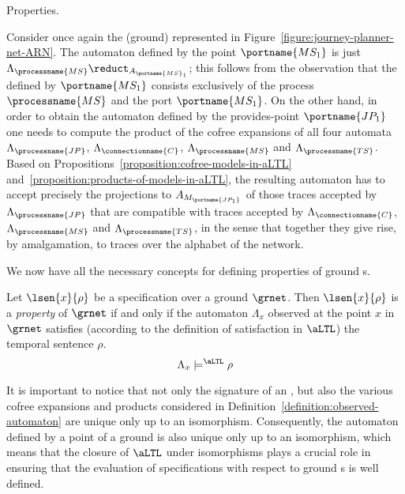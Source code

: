 \documentclass{LMCS}
\begin{document}
\begin{minisection}{Properties.}
    \begin{exa}
      Consider once again the (ground)  represented in Figure~\ref{figure:journey-planner-net-ARN}.
      The automaton defined by the point \(\portname{MS_{1}}\) is just \(\Lambda_{\processname{MS}} \reduct_{A_{\portname{MS}_{1}}}\); this follows from the observation that the  defined by \(\portname{MS_{1}}\) consists exclusively of the process \(\processname{MS}\) and the port \(\portname{MS_{1}}\).
      On the other hand, in order to obtain the automaton defined by the provides-point \(\portname{JP_{1}}\) one needs to compute the product of the cofree expansions of all four automata \(\Lambda_{\processname{JP}}\), \(\Lambda_{\connectionname{C}}\), \(\Lambda_{\processname{MS}}\) and \(\Lambda_{\processname{TS}}\).
      Based on Propositions~\ref{proposition:cofree-models-in-aLTL} and~\ref{proposition:products-of-models-in-aLTL}, the resulting automaton has to accept precisely the projections to \(A_{M_{\portname{JP_{1}}}}\) of those traces accepted by \(\Lambda_{\processname{JP}}\) that are compatible with traces accepted by \(\Lambda_{\connectionname{C}}\), \(\Lambda_{\processname{MS}}\) and \(\Lambda_{\processname{TS}}\), in the sense that together they give rise, by amalgamation, to traces over the alphabet of the network.
    \end{exa}

    We now have all the necessary concepts for defining properties of ground s.

    \begin{defi}
      Let \(\lsen{x}{\rho}\) be a specification over a ground  \(\grnet\).
      Then \(\lsen{x}{\rho}\) is a \emph{property} of \(\grnet\) if and only if the automaton \(\Lambda_{x}\) observed at the point \(x\) in \(\grnet\) satisfies (according to the definition of satisfaction in \(\aLTL\)) the temporal sentence \(\rho\).
      \[
      \Lambda_{x} \models^{\aLTL} \rho
      \]
    \end{defi}

    \begin{rem}
      It is important to notice that not only the signature of an , but also the various cofree expansions and products considered in Definition~\ref{definition:observed-automaton} are unique only up to an isomorphism.  Consequently, the automaton defined by a point of a ground  is also unique only up to an isomorphism, which means that the closure of \(\aLTL\) under isomorphisms plays a crucial role in ensuring that the evaluation of specifications with respect to ground s is well defined.
    \end{rem}


\end{minisection}
\end{document}
